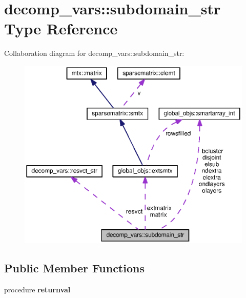 \section{decomp\+\_\+vars\+:\+:subdomain\+\_\+str Type Reference}
\label{structdecomp__vars_1_1subdomain__str}


Collaboration diagram for decomp\+\_\+vars\+:\+:subdomain\+\_\+str\+:\nopagebreak
\begin{figure}[H]
\begin{center}
\leavevmode
\includegraphics[width=350pt]{structdecomp__vars_1_1subdomain__str__coll__graph}
\end{center}
\end{figure}
\subsection*{Public Member Functions}
\begin{DoxyCompactItemize}
\item 
procedure {\bf returnval}
\end{DoxyCompactItemize}
